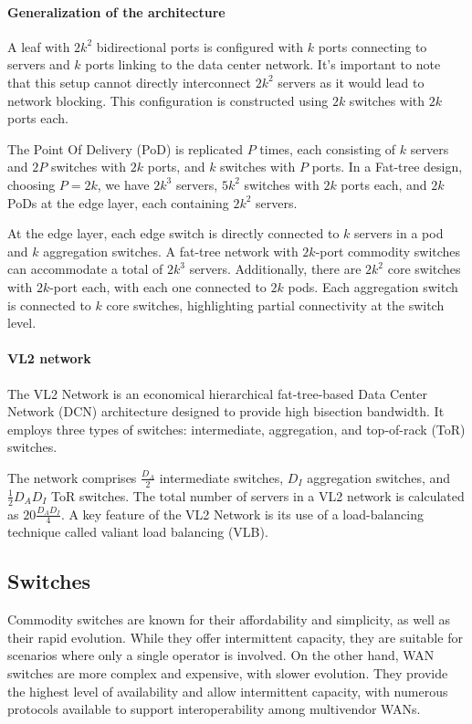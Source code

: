\paragraph*{Generalization of the architecture}
A leaf with $2k^2$ bidirectional ports is configured with $k$ ports connecting to servers and $k$ ports linking to the data center network. 
It's important to note that this setup cannot directly interconnect $2k^2$ servers as it would lead to network blocking. 
This configuration is constructed using $2k$ switches with $2k$ ports each.

The Point Of Delivery (PoD) is replicated $P$ times, each consisting of $k$ servers and $2P$ switches with $2k$ ports, and $k$ switches with $P$ ports. 
In a Fat-tree design, choosing $P=2k$, we have $2k^3$ servers, $5k^2$ switches with $2k$ ports each, and $2k$ PoDs at the edge layer, each containing $2k^2$ servers.

At the edge layer, each edge switch is directly connected to $k$ servers in a pod and $k$ aggregation switches. 
A fat-tree network with $2k$-port commodity switches can accommodate a total of $2k^3$ servers. 
Additionally, there are $2k^2$ core switches with $2k$-port each, with each one connected to $2k$ pods. 
Each aggregation switch is connected to $k$ core switches, highlighting partial connectivity at the switch level.

\paragraph*{VL2 network}

The VL2 Network is an economical hierarchical fat-tree-based Data Center Network (DCN) architecture designed to provide high bisection bandwidth. 
It employs three types of switches: intermediate, aggregation, and top-of-rack (ToR) switches.

The network comprises $\frac{D_A}{2}$ intermediate switches, $D_I$ aggregation switches, and $\frac{1}{2}D_AD_I$ ToR switches. 
The total number of servers in a VL2 network is calculated as $20\frac{D_AD_I}{4}$. 
A key feature of the VL2 Network is its use of a load-balancing technique called valiant load balancing (VLB).

\subsection{Switches}
Commodity switches are known for their affordability and simplicity, as well as their rapid evolution. 
While they offer intermittent capacity, they are suitable for scenarios where only a single operator is involved. 
On the other hand, WAN switches are more complex and expensive, with slower evolution. 
They provide the highest level of availability and allow intermittent capacity, with numerous protocols available to support interoperability among multivendor WANs.

